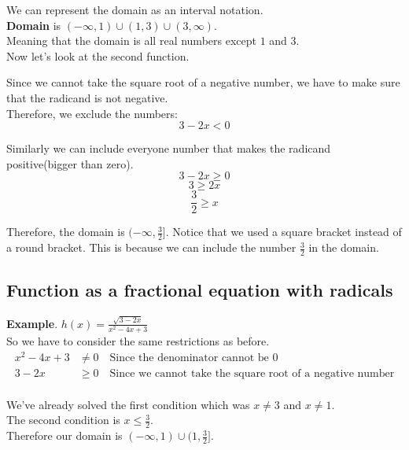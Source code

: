 We can represent the domain as an interval notation. \\
\textbf{Domain} is $(-\infty, 1) \cup (1, 3) \cup (3, \infty)$. \\
Meaning that the domain is all real numbers except $1$ and $3$. \\

Now let's look at the second function.

Since we cannot take the square root of a negative number, we have to make sure that the radicand is not negative. \\

Therefore, we exclude the numbers:
$$ 3-2x < 0$$

Similarly we can include everyone number that makes the radicand positive(bigger than zero). \\
$$ 3-2x \ge 0$$
$$ 3 \ge 2x$$
$$ \frac{3}{2} \ge x$$

Therefore, the domain is $(-\infty, \frac{3}{2}]$.
Notice that we used a square bracket instead of a round bracket. This is because we can include the number $\frac{3}{2}$ in the domain. \\

\subsection{Function as a fractional equation with radicals}

\textbf{Example}. $\displaystyle h(x)=\frac{\sqrt{3-2x}}{x^2-4x+3}$ \\

So we have to consider the same restrictions as before. \\

\begin{align*}
	x^2-4x+3 &\neq 0 \quad \text{Since the denominator cannot be 0} \\
	3-2x &\ge 0 \quad \text{Since we cannot take the square root of a negative number} \\
\end{align*}

We've already solved the first condition which was $x\neq3$ and $x\neq1$. \\
The second condition is $x\le\frac{3}{2}$. \\

Therefore our domain is $(-\infty, 1) \cup (1, \frac{3}{2}]$. \\
